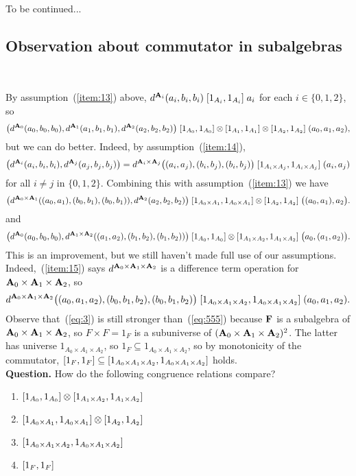 \medskip
To be continued...

\subsection{Observation about commutator in subalgebras}
~

\noindent By assumption~(\ref{item:13}) above, 
$d^{\mathbf{A}_i}(a_i, b_i, b_i) \mathrel{[1_{A_i}, 1_{A_i}]} a_i$ for
each $i \in \{0,1,2\}$, so
\begin{equation*}
\bigl(d^{\mathbf{A}_0}(a_0, b_0, b_0), d^{\mathbf{A}_1}(a_1, b_1, b_1), d^{\mathbf{A}_2}(a_2, b_2, b_2)\bigr)
 \mathrel{[1_{A_0}, 1_{A_0}] \otimes  [1_{A_1}, 1_{A_1}] \otimes [1_{A_2}, 1_{A_2}]} (a_0, a_1, a_2),
\end{equation*}
but we can do better.
Indeed, by assumption~(\ref{item:14}),
\[
\bigl(d^{\mathbf{A}_i}(a_i, b_i, b_i), d^{\mathbf{A}_j}(a_j, b_j, b_j)\bigr)
=d^{\mathbf{A}_i\times \mathbf{A}_j}\bigl((a_i, a_j), (b_i,b_j), (b_i, b_j)\bigr)
\mathrel{[1_{A_i\times A_j}, 1_{A_i\times A_j}]} (a_i, a_j)
\]
for all $i\neq j$ in $\{0,1,2\}$.
Combining this with assumption~(\ref{item:13}) we have
\[
\bigl(d^{\mathbf{A}_0\times \mathbf{A}_1}((a_0, a_1), (b_0,b_1), (b_0, b_1)),
d^{\mathbf{A}_2}(a_2, b_2,b_2)\bigr)
\mathrel{[1_{A_0\times A_1}, 1_{A_0\times A_1}] \otimes [1_{A_2}, 1_{A_2}]}
\bigl((a_0, a_1),a_2\bigr).
\]
and 
\[
\bigl(d^{\mathbf{A}_0}(a_0, b_0, b_0), d^{\mathbf{A}_1\times \mathbf{A}_2}((a_1, a_2), (b_1,b_2), (b_1, b_2))\bigr)
\mathrel{[1_{A_0}, 1_{A_0}] \otimes [1_{A_1\times A_2}, 1_{A_1\times A_2}]} \bigl(a_0, (a_1, a_2)\bigr).
\]
This is an improvement, %
but we still haven't made full use of our assumptions.
Indeed,~(\ref{item:15}) says
$d^{\mathbf{A}_0\times \mathbf{A}_1 \times \mathbf{A}_2}$ is a difference term operation for 
$\mathbf{A}_0\times \mathbf{A}_1 \times \mathbf{A}_2$, so
\begin{equation}
    \label{eq:555}
  d^{\mathbf{A}_0\times \mathbf{A}_1 \times \mathbf{A}_2}\bigl((a_0, a_1, a_2), (b_0, b_1, b_2), (b_0, b_1, b_2)\bigr)
  \mathrel{[1_{A_0\times A_1\times A_2}, 1_{A_0\times A_1\times A_2}]} (a_0, a_1, a_2).
\end{equation}
Observe that~(\ref{eq:3}) is still stronger than~(\ref{eq:555})
because $\mathbf{F}$ is a subalgebra of $\mathbf{A}_0\times \mathbf{A}_1 \times \mathbf{A}_2$, so 
$F \times F = 1_F$ is a subuniverse of
$(\mathbf{A}_0 \times \mathbf{A}_1 \times \mathbf{A}_2)^2$.  The latter has universe
$1_{A_0 \times A_1 \times A_2}$, so
$1_F \subseteq 1_{A_0 \times A_1 \times A_2}$, so by monotonicity of the commutator,
$[1_F, 1_F] \subseteq [1_{A_0\times A_1\times A_2}, 1_{A_0\times A_1\times A_2}]$ holds.
\\[4pt]
{\bf Question.} How do the following congruence relations compare?
\begin{enumerate}
\item $[1_{A_0}, 1_{A_0}] \otimes [1_{A_1\times A_2}, 1_{A_1\times A_2}]$
\item $[1_{A_0\times A_1}, 1_{A_0\times A_1}] \otimes [1_{A_2}, 1_{A_2}]$
\item $[1_{A_0\times A_1\times A_2}, 1_{A_0\times A_1\times A_2}]$
\item $[1_F, 1_F]$
\end{enumerate}

